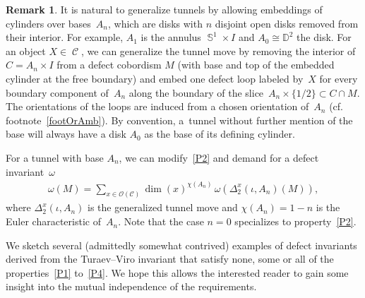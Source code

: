 \documentclass[pdftex]{sigma}
\DeclareMathOperator{\Sp}{\mathbb{S}}
\DeclareMathOperator{\calc}{\mathcal{C}}
\numberwithin{equation}{section}
\theoremstyle{definition}
\newtheorem{Remark}[Remark]{Remark}
\begin{document}
\begin{Remark} \label{remGenTun}
It is natural to generalize tunnels by allowing embeddings of cylinders over bases~$A_n$, which are disks with $n$ disjoint open disks removed from their interior. For example, $A_1$ is the annulus $\Sp^1 \times I$ and $A_0 \cong \mathbb{D}^2$ the disk. For an object $X \in \calc$, we can generalize the tunnel move by removing the interior of $C = A_n \times I$ from a defect cobordism $M$ (with base and top of the embedded cylinder at the free boundary) and embed one defect loop labeled by~$X$ for every boundary component of~$A_n$ along the boundary of the slice~$A_n \times \{1/2\} \subset C \cap M$. The orientations of the loops are induced from a chosen orientation of~$A_n$ (cf. footnote~\ref{footOrAmb}). By convention, a~tunnel without further mention of the base will always have a disk $A_0$ as the base of its defining cylinder.

For a tunnel with base $A_n$, we can modify~\ref{P2} and demand for a defect invariant~$\omega$
\begin{align}\label{eqGenTun}
\omega(M) = \sum_{x \in \mathcal{O}(\mathcal{C})}\dim(x)^{\chi(A_n)} \, \omega(\Delta_2^x(\iota, A_n)(M)),
 \end{align}
 where $\Delta_2^x(\iota, A_n)$ is the generalized tunnel move and $\chi(A_n) = 1-n$ is the Euler characteristic of~$A_n$. Note that the case $n = 0$ specializes to property~\ref{P2}.
\end{Remark}
We sketch several (admittedly somewhat contrived) examples of defect invariants derived from the Turaev--Viro invariant that satisfy none, some or all of the properties~\ref{P1} to~\ref{P4}. We hope this allows the interested reader to gain some insight into the mutual independence of the requirements.
\end{document}
